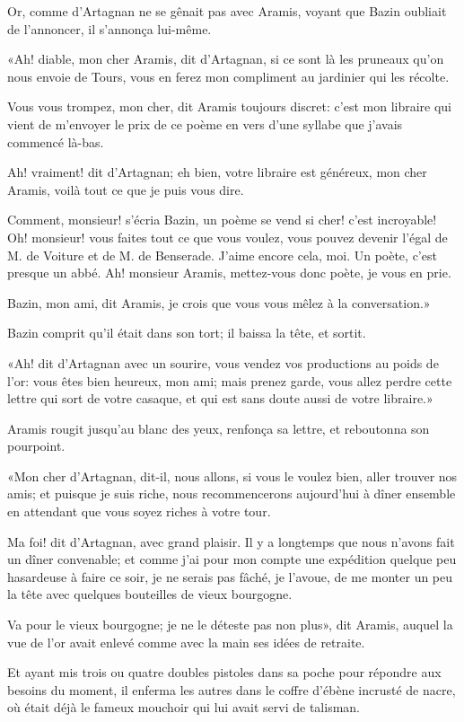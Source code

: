Or, comme d'Artagnan ne se gênait pas avec Aramis, voyant que Bazin oubliait de l'annoncer, il s'annonça lui-même. 

«Ah! diable, mon cher Aramis, dit d'Artagnan, si ce sont là les pruneaux qu'on nous envoie de Tours, vous en ferez mon compliment au jardinier qui les récolte. 

\speak  Vous vous trompez, mon cher, dit Aramis toujours discret: c'est mon libraire qui vient de m'envoyer le prix de ce poème en vers d'une syllabe que j'avais commencé là-bas. 

\speak  Ah! vraiment! dit d'Artagnan; eh bien, votre libraire est généreux, mon cher Aramis, voilà tout ce que je puis vous dire. 

\speak  Comment, monsieur! s'écria Bazin, un poème se vend si cher! c'est incroyable! Oh! monsieur! vous faites tout ce que vous voulez, vous pouvez devenir l'égal de M. de Voiture et de M. de Benserade. J'aime encore cela, moi. Un poète, c'est presque un abbé. Ah! monsieur Aramis, mettez-vous donc poète, je vous en prie. 

\speak  Bazin, mon ami, dit Aramis, je crois que vous vous mêlez à la conversation.» 

Bazin comprit qu'il était dans son tort; il baissa la tête, et sortit. 

«Ah! dit d'Artagnan avec un sourire, vous vendez vos productions au poids de l'or: vous êtes bien heureux, mon ami; mais prenez garde, vous allez perdre cette lettre qui sort de votre casaque, et qui est sans doute aussi de votre libraire.» 

Aramis rougit jusqu'au blanc des yeux, renfonça sa lettre, et reboutonna son pourpoint. 

«Mon cher d'Artagnan, dit-il, nous allons, si vous le voulez bien, aller trouver nos amis; et puisque je suis riche, nous recommencerons aujourd'hui à dîner ensemble en attendant que vous soyez riches à votre tour. 

\speak  Ma foi! dit d'Artagnan, avec grand plaisir. Il y a longtemps que nous n'avons fait un dîner convenable; et comme j'ai pour mon compte une expédition quelque peu hasardeuse à faire ce soir, je ne serais pas fâché, je l'avoue, de me monter un peu la tête avec quelques bouteilles de vieux bourgogne. 

\speak  Va pour le vieux bourgogne; je ne le déteste pas non plus», dit Aramis, auquel la vue de l'or avait enlevé comme avec la main ses idées de retraite. 

Et ayant mis trois ou quatre doubles pistoles dans sa poche pour répondre aux besoins du moment, il enferma les autres dans le coffre d'ébène incrusté de nacre, où était déjà le fameux mouchoir qui lui avait servi de talisman. 

